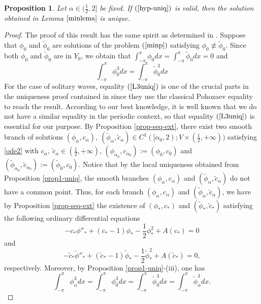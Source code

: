 \documentclass[12pt,reqno]{amsart}
\newcommand{\2}{L^2_{per}(0, T)}
\numberwithin{equation}{section}
\numberwithin{figure}{section}
\newtheorem{proposition}[theorem]{Proposition}
\begin{document}
\begin{proposition}\label{theo-uniq}
	Let $\alpha\in(\frac{1}{2},2]$ be fixed. If $(\ref{hyp-uniq})$ is valid, then the solution obtained in Lemma $\ref{minlema}$  is unique.
\end{proposition}
\begin{proof}
	The proof of this result has the same spirit as determined in \cite[Theorem 2.4]{FL}. Suppose that $\phi_0$ and $\tilde{\phi}_0$ are solutions of the problem $(\ref{minp})$ satisfying $\phi_0\not\equiv\tilde{\phi}_0$. Since both $\phi_0$ and $\tilde{\phi}_0$ are in $Y_0$, we obtain that $\int_{-\pi}^{\pi}\phi_0dx=\int_{-\pi}^{\pi}\tilde{\phi}_0dx=0$ and  \begin{equation}\int_{-\pi}^{\pi}\phi_0^3dx=\int_{-\pi}^{\pi}\tilde{\phi}_0^3dx
		\label{L3uniq}\end{equation} For the case of solitary waves, equality $(\ref{L3uniq})$ is one of the crucial parts in the uniqueness proof  contained in \cite{FL} since they use the classical Pohozaev equality to reach the result. According to our best knowledge, it is well known that we do not have a similar equality in the periodic context, so that equality $(\ref{L3uniq})$ is essential for our purpose. By Proposition \ref{prop-seq-ext}, there exist two smooth branch of solutions $(\phi_{\alpha}, c_{\alpha}), \ (\tilde{\phi}_{\alpha}, \tilde{c}_{\alpha})\in C^1([\alpha_0, 2);V\times\left(\frac{1}{2},+\infty\right))$ satisfying \eqref{ode2} with $c_{\alpha}, \ \tilde{c}_{\alpha} \in \left(\frac{1}{2},+\infty\right)$, $(\phi_{\alpha_0}, c_{\alpha_0}) := (\phi_0, c_0)$ and $(\tilde{\phi}_{\alpha_0}, \tilde{c}_{\alpha_0}) := (\tilde{\phi}_0, c_0)$. Notice that by the local uniqueness obtained from Proposition \ref{prop1-uniq}, the smooth branches $(\phi_{\alpha}, c_{\alpha})$ and $(\tilde{\phi}_{\alpha}, \tilde{c}_{\alpha})$ do not have a common point. Thus, for each branch $(\phi_{\alpha}, c_{\alpha})$ and $(\tilde{\phi}_{\alpha}, \tilde{c}_{\alpha})$, we have by Proposition \ref{prop-seq-ext} the existence of $(\phi_{*},c_{*})$ and $(\tilde{\phi}_{*}, \tilde{c}_{*})$ satisfying the following ordinary differential equations
			\begin{equation}\label{eq-sol}
				-c_{*}\phi''_{*}+(c_{*}-1)\phi_{*}-\frac{1}{2}\phi_{*}^2+A(c_{*})=0
			\end{equation}
			and
			\begin{equation}\label{eq-sol2}	-\tilde{c}_{*}\tilde{\phi}''_{*}+(\tilde{c}_{*}-1)\tilde{\phi}_{*}-\frac{1}{2}\tilde{\phi}_{*}^2+A(\tilde{c}_{*})=0,	
			\end{equation}
			respectively. Moreover, by Proposition \ref{prop1-uniq}-(iii), one has	\begin{equation}\label{relac}\displaystyle	\int_{-\pi}^{\pi}\phi_{\alpha}^3dx = \int_{-\pi}^{\pi}\phi_0^3dx=\int_{-\pi}^{\pi}\tilde{\phi}_0^3dx =\int_{-\pi}^{\pi}\tilde{\phi}_{\alpha}^3dx.\end{equation}
			

\end{proof}
\end{document}
